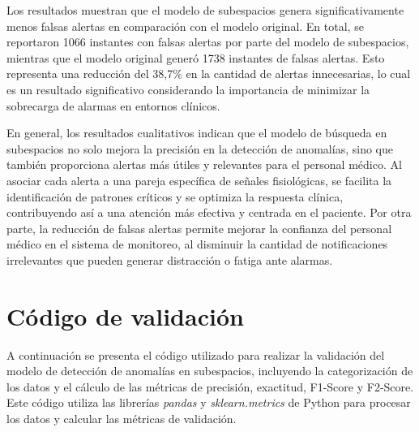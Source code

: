 Los resultados muestran que el modelo de subespacios genera significativamente menos falsas alertas en comparación con el modelo original. En total, se reportaron 1066 instantes con falsas alertas por parte del modelo de subespacios, mientras que el modelo original generó 1738 instantes de falsas alertas. Esto representa una reducción del 38,7\% en la cantidad de alertas innecesarias, lo cual es un resultado significativo considerando la importancia de minimizar la sobrecarga de alarmas en entornos clínicos.

En general, los resultados cualitativos indican que el modelo de búsqueda en subespacios no solo mejora la precisión en la detección de anomalías, sino que también proporciona alertas más útiles y relevantes para el personal médico. Al asociar cada alerta a una pareja específica de señales fisiológicas, se facilita la identificación de patrones críticos y se optimiza la respuesta clínica, contribuyendo así a una atención más efectiva y centrada en el paciente. Por otra parte, la reducción de falsas alertas permite mejorar la confianza del personal médico en el sistema de monitoreo, al disminuir la cantidad de notificaciones irrelevantes que pueden generar distracción o fatiga ante alarmas.

\section{Código de validación}

A continuación se presenta el código utilizado para realizar la validación del modelo de detección de anomalías en subespacios, incluyendo la categorización de los datos y el cálculo de las métricas de precisión, exactitud, F1-Score y F2-Score. Este código utiliza las librerías \textit{pandas} y \textit{sklearn.metrics} de Python para procesar los datos y calcular las métricas de validación.

